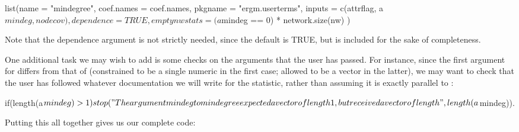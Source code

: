 \documentclass[nojss]{jss}
\begin{document}
\begin{CodeChunk}
\begin{CodeInput}
  list(name = "mindegree",
    coef.names = coef.names,
    pkgname = "ergm.userterms",
    inputs = c(attrflag, a$mindeg, nodecov),
    dependence = TRUE,
    emptynwstats = (a$mindeg == 0) * network.size(nw)
  )
\end{CodeInput}
\end{CodeChunk}

Note that the dependence argument is not strictly needed, since the default is TRUE, but is included for the sake of completeness.

One additional task we may wish to add is some checks on the arguments that the user has passed.  For instance, since the first argument for  differs from that of  (constrained to be a single numeric in the first case; allowed to be a vector in the latter), we may want to check that the user has followed whatever documentation we will write for the statistic, rather than assuming it is exactly parallel to :

\begin{CodeChunk}
\begin{CodeInput}
  if(length(a$mindeg) > 1)
    stop("The argument mindeg to mindegree expected a vector of length
          1, but received a vector of length", length(a$mindeg)).
\end{CodeInput}
\end{CodeChunk}

Putting this all together gives us our complete  code:

\begin{CodeChunk}
\end{CodeChunk}
\end{document}
